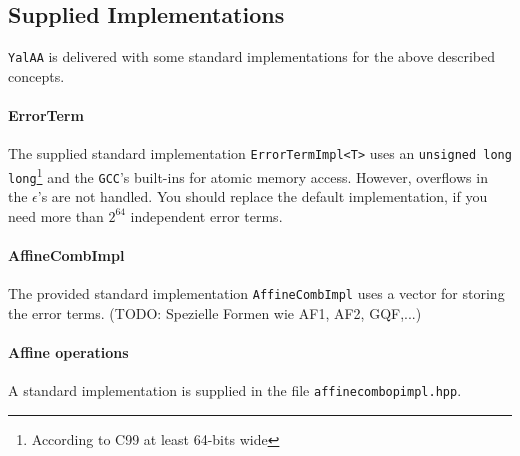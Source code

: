 \documentclass[a4]{scrartcl}
\newcommand{\yalaa}{\texttt{YalAA}\xspace}
\begin{document}
\subsection{Supplied Implementations}
\yalaa is delivered with some standard implementations for the above described
concepts. 
\paragraph{ErrorTerm}
The supplied standard implementation \texttt{ErrorTermImpl<T>} uses an
\texttt{unsigned long long}\footnote{According to C99 at least 64-bits wide}
and the \texttt{GCC}'s built-ins for atomic memory access. However, overflows
in the $\epsilon$'s are not handled. You should replace the default
implementation, if you need more than $2^{64}$ independent error terms.

\paragraph{AffineCombImpl}
The provided standard implementation \texttt{AffineCombImpl} uses a vector for
storing the error terms. (TODO: Spezielle Formen wie AF1, AF2, GQF,...)

\paragraph{Affine operations}
A standard implementation is supplied
in the file \texttt{affinecombopimpl.hpp}.
\end{document}
